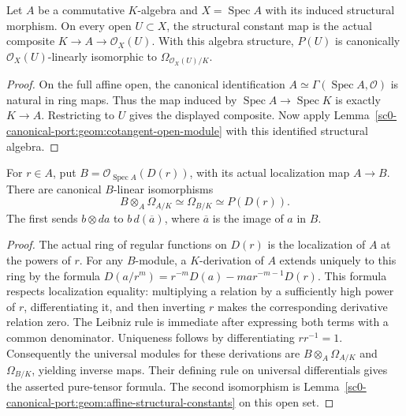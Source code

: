 \begin{lemma}
\label{sc0-canonical-port:geom:affine-structural-constants}
\leanok
Let \(A\) be a commutative \(K\)-algebra and
\(X=\operatorname{Spec}A\) with its induced structural morphism.
On every open \(U\subset X\), the structural constant map is
the actual composite \(K\to A\to\mathcal O_X(U)\).
With this algebra structure, \(P(U)\) is canonically
\(\mathcal O_X(U)\)-linearly isomorphic to
\(\Omega_{\mathcal O_X(U)/K}\).
\end{lemma}
\begin{proof}
On the full affine open, the canonical identification
\(A\simeq\Gamma(\operatorname{Spec}A,\mathcal O)\) is natural
in ring maps. Thus the map induced by
\(\operatorname{Spec}A\to\operatorname{Spec}K\) is exactly
\(K\to A\). Restricting to \(U\) gives the displayed
composite. Now apply Lemma~\ref{sc0-canonical-port:geom:cotangent-open-module} with
this identified structural algebra.
\end{proof}

\begin{theorem}
\label{sc0-canonical-port:geom:affine-cotangent-localization}
\leanok
For \(r\in A\), put
\(B=\mathcal O_{\operatorname{Spec}A}(D(r))\), with its actual
localization map \(A\to B\). There are canonical
\(B\)-linear isomorphisms
\[
 B\otimes_A\Omega_{A/K}\simeq\Omega_{B/K}\simeq P(D(r)).
\]
The first sends \(b\otimes da\) to \(b\,d(\overline a)\),
where \(\overline a\) is the image of \(a\) in \(B\).
\end{theorem}
\begin{proof}
The actual ring of regular functions on \(D(r)\) is the
localization of \(A\) at the powers of \(r\). For any
\(B\)-module, a \(K\)-derivation of \(A\) extends uniquely
to this ring by the formula
\(D(a/r^m)=r^{-m}D(a)-m a r^{-m-1}D(r)\).
This formula respects localization equality: multiplying a relation
by a sufficiently high power of \(r\), differentiating it, and
then inverting \(r\) makes the corresponding derivative relation
zero. The Leibniz rule is immediate after expressing both terms
with a common denominator. Uniqueness follows by differentiating
\(rr^{-1}=1\).
Consequently the universal modules for these derivations are
\(B\otimes_A\Omega_{A/K}\) and \(\Omega_{B/K}\), yielding
inverse maps. Their defining rule on universal differentials gives
the asserted pure-tensor formula. The second isomorphism is
Lemma~\ref{sc0-canonical-port:geom:affine-structural-constants} on this open set.
\end{proof}

